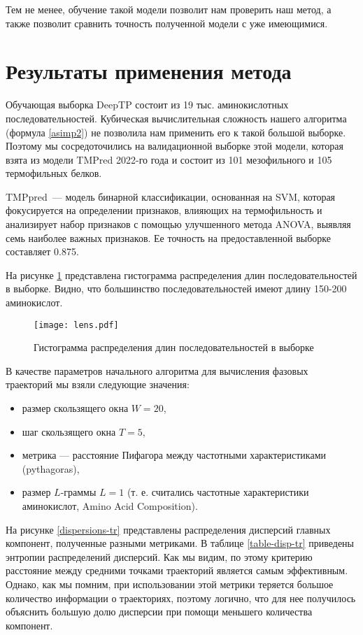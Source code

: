 Тем не менее, обучение такой модели позволит нам проверить наш метод, а также позволит сравнить точность полученной модели с уже имеющимися.

\section{Результаты применения метода}

Обучающая выборка DeepTP состоит из 19 тыс. аминокислотных последовательностей. Кубическая вычислительная сложность нашего алгоритма (формула \ref{asimp2}) не позволила нам применить его к такой большой выборке. Поэтому мы сосредоточились на валидационной выборке этой модели, которая взята из модели TMPred \cite{Meng2022} 2022-го года и состоит из 101 мезофильного и 105 термофильных белков.

TMPpred~--- модель бинарной классификации, основанная на SVM, которая фокусируется на определении признаков, влияющих на термофильность и анализирует набор признаков с помощью улучшенного метода ANOVA, выявляя семь наиболее важных признаков. Ее точность на предоставленной выборке составляет 0.875.

На рисунке \ref{lens} представлена гистограмма распределения длин последовательностей в выборке. Видно, что большинство последовательностей имеют длину 150-200 аминокислот.

\begin{figure}[htb]
  \centering
  \texttt{[image: lens.pdf]}
  \caption{Гистограмма распределения длин последовательностей в выборке}
  \label{lens}
\end{figure}

В качестве параметров начального алгоритма для вычисления фазовых траекторий мы взяли следующие значения:

\begin{itemize}
  \item размер скользящего окна $W = 20$,
  \item шаг скользящего окна $T = 5$,
  \item метрика --- расстояние Пифагора между частотными характеристиками (pythagoras), 
  \item размер $L$-граммы $L = 1$ (т. е. считались частотные характеристики аминокислот, Amino Acid Composition).
\end{itemize}

На рисунке \ref{dispersions-tr} представлены распределения дисперсий главных компонент, полученные разными метриками. В таблице \ref{table-disp-tr} приведены энтропии распределений дисперсий. Как мы видим, по этому критерию расстояние между средними точками траекторий является самым эффективным. Однако, как мы помним, при использовании этой метрики теряется большое количество информации о траекториях, поэтому логично, что для нее получилось объяснить большую долю дисперсии при помощи меньшего количества компонент.


